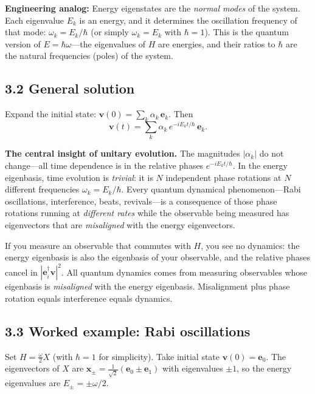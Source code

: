 \documentclass[12pt,a4paper]{article}
\begin{document}
\medskip
\noindent\textbf{Engineering analog:} Energy eigenstates are the \emph{normal modes} of the system.  Each eigenvalue $E_k$ is an energy, and it determines the oscillation frequency of that mode: $\omega_k = E_k/\hbar$ (or simply $\omega_k = E_k$ with $\hbar=1$).  This is the quantum version of $E = \hbar\omega$---the eigenvalues of $H$ are energies, and their ratios to $\hbar$ are the natural frequencies (poles) of the system.

\subsection{3.2 General solution}
Expand the initial state: $\mathbf{v}(0) = \sum_k \alpha_k\,\mathbf{e}_k$.  Then
\[
    \boxed{\mathbf{v}(t) = \sum_k \alpha_k\,e^{-iE_k t/\hbar}\,\mathbf{e}_k.}
\]

\medskip
\noindent\textbf{The central insight of unitary evolution.}  The magnitudes $|\alpha_k|$ do not change---all time dependence is in the relative phases $e^{-iE_k t/\hbar}$.  In the energy eigenbasis, time evolution is \emph{trivial}: it is $N$ independent phase rotations at $N$ different frequencies $\omega_k = E_k/\hbar$.  Every quantum dynamical phenomenon---Rabi oscillations, interference, beats, revivals---is a consequence of those phase rotations running at \emph{different rates} while the observable being measured has eigenvectors that are \emph{misaligned} with the energy eigenvectors.

If you measure an observable that commutes with $H$, you see no dynamics: the energy eigenbasis is also the eigenbasis of your observable, and the relative phases cancel in $|\mathbf{e}_i^\dagger\mathbf{v}|^2$.  All quantum dynamics comes from measuring observables whose eigenbasis is \emph{misaligned} with the energy eigenbasis.  Misalignment plus phase rotation equals interference equals dynamics.

\medskip
\noindent{}

\subsection{3.3 Worked example: Rabi oscillations}
Set $H = \frac{\omega}{2}X$ (with $\hbar=1$ for simplicity).  Take initial state $\mathbf{v}(0)=\mathbf{e}_0$.  The eigenvectors of $X$ are $\mathbf{x}_\pm = \frac{1}{\sqrt{2}}(\mathbf{e}_0\pm\mathbf{e}_1)$ with eigenvalues $\pm 1$, so the energy eigenvalues are $E_\pm = \pm\omega/2$.
\end{document}
